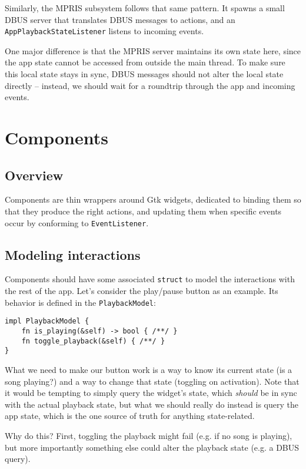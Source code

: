 \documentclass[12pt, a4paper]{article}
\begin{document}
Similarly, the MPRIS subsystem follows that same pattern. It spawns a small DBUS server that translates DBUS messages to actions, and an \texttt{AppPlaybackStateListener} listens to incoming events.

One major difference is that the MPRIS server maintains its own state here, since the app state cannot be accessed from outside the main thread. To make sure this local state stays in sync, DBUS messages should not alter the local state directly -- instead, we should wait for a roundtrip through the app and incoming events.

\section{Components}

\subsection{Overview}

Components are thin wrappers around Gtk widgets, dedicated to binding them so that they produce the right actions, and updating them when specific events occur by conforming to \texttt{EventListener}. 

\subsection{Modeling interactions}

Components should have some associated \texttt{struct} to model the interactions with the rest of the app. Let's consider the play/pause button as an example. Its behavior is defined in the \texttt{PlaybackModel}:

\begin{verbatim}
impl PlaybackModel {
    fn is_playing(&self) -> bool { /**/ }
    fn toggle_playback(&self) { /**/ }
}
\end{verbatim}

What we need to make our button work is a way to know its current state (is a song playing?) and a way to change that state (toggling on activation). Note that it would be tempting to simply query the widget's state, which \emph{should} be in sync with the actual playback state, but what we should really do instead is query the app state, which is the one source of truth for anything state-related. 

Why do this? First, toggling the playback might fail (e.g. if no song is playing), but more importantly something else could alter the playback state (e.g. a DBUS query).
\end{document}
